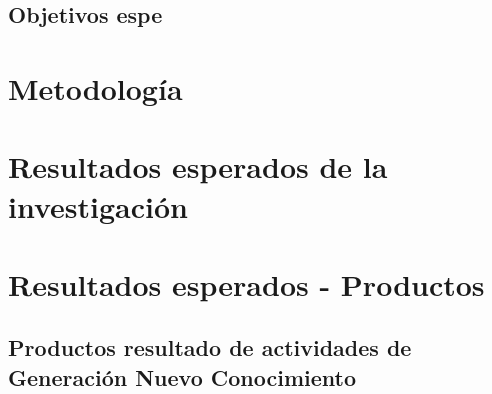 \documentclass[12pt]{article}
\begin{document}
\subsection{Objetivos espe}



\section{Metodolog\'ia}

\section{Resultados esperados de la investigaci\'on}

\section{Resultados esperados - Productos}

 
\subsection{Productos resultado de actividades de Generación Nuevo
  Conocimiento} 
\end{document}
